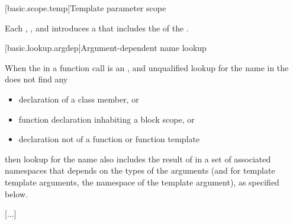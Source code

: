 \documentclass{wg21}
\begin{document}
[basic.scope.temp]{Template parameter scope}%

\pnum
Each 
{, , and\linebreak
{}} introduces
a 
that includes the  of
the .


[basic.lookup.argdep]{Argument-dependent name lookup}

\pnum
When the  in
a function call is an ,
and unqualified lookup
for the name in the  does not find any
\begin{itemize}
    \item
    declaration of a class member, or
    \item
    function declaration inhabiting a block scope, or
    \item
    declaration not of a function or function template
\end{itemize}
then lookup for the name also includes the result of
 in a set of associated namespaces
that depends on the types of the arguments
(and for  template template arguments, the namespace of the template argument),
as specified below.

\textcolor{noteclr}{[...]}
\end{document}
